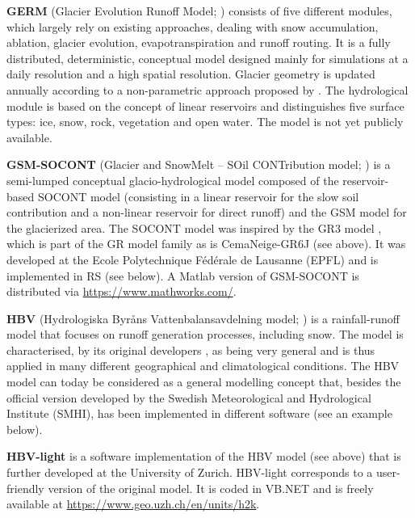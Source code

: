 \documentclass[10pt,a4paper]{article}
\begin{document}
\textbf{GERM} (Glacier Evolution Runoff Model; \citealt{Huss2016, Farinotti2012}) consists of five different modules, which largely rely on existing approaches, dealing with snow accumulation, ablation, glacier evolution, evapotranspiration and runoff routing. It is a fully distributed, deterministic, conceptual model designed mainly for simulations at a daily resolution and a high spatial resolution. Glacier geometry is updated annually according to a non-parametric approach proposed by \citet{Huss2010}. The hydrological module is based on the concept of linear reservoirs and distinguishes five surface types: ice, snow, rock, vegetation and open water. The model is not yet publicly available.

\textbf{GSM-SOCONT} (Glacier and SnowMelt -- SOil CONTribution model; \citealp{Schaefli2005c}) is a semi-lumped conceptual glacio-hydrological model composed of the reservoir-based SOCONT model (consisting in a linear reservoir for the slow soil contribution and a non-linear reservoir for direct runoff) and the GSM model for the glacierized area. The SOCONT model was inspired by the GR3 model \citep{Edijatno1989}, which is part of the GR model family as is CemaNeige-GR6J (see above). It was developed at the Ecole Polytechnique Fédérale de Lausanne (EPFL) and is implemented in RS (see below). A Matlab version of GSM-SOCONT is distributed via \url{https://www.mathworks.com/}.

\textbf{HBV} (Hydrologiska Byråns Vattenbalansavdelning model; \citealp{Bergstrom1976a, Bergstrom1992, Bergstrom1995, Lindstrm1997})  is a rainfall-runoff model that focuses on runoff generation processes, including snow. The model is characterised, by its original developers \citep{Bergstrom1992}, as being very general and is thus applied in many different geographical and climatological conditions. The HBV model can today be considered as a general modelling concept that, besides the official version developed by the Swedish Meteorological and Hydrological Institute (SMHI), has been implemented in different software (see an example below).

\textbf{HBV-light} \citep{Seibert2012} is a software implementation of the HBV model (see above) that is further developed at the University of Zurich. HBV-light corresponds to a user-friendly version of the original model. It is coded in VB.NET and is freely available at \url{https://www.geo.uzh.ch/en/units/h2k}.
\end{document}
